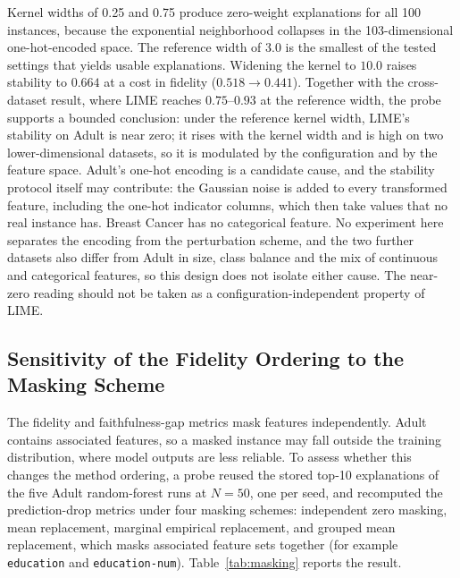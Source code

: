 \documentclass{cleiej}
\begin{document}
Kernel widths of 0.25 and 0.75 produce zero-weight explanations for all 100
instances, because the exponential neighborhood collapses in the
103-dimensional one-hot-encoded space. The reference width of 3.0 is the
smallest of the tested settings that yields usable explanations. Widening
the kernel to $10.0$ raises stability to $0.664$ at a cost in fidelity
($0.518 \rightarrow 0.441$). Together with the cross-dataset result, where
LIME reaches $0.75$--$0.93$ at the reference width, the probe supports a
bounded conclusion: under the reference kernel width, LIME's stability on
Adult is near zero; it rises with the kernel width and is high on two
lower-dimensional datasets, so it is modulated by the configuration and by
the feature space. Adult's one-hot encoding is a candidate cause, and the
stability protocol itself may contribute: the Gaussian noise is added to
every transformed feature, including the one-hot indicator columns, which
then take values that no real instance has. Breast Cancer has no
categorical feature. No experiment here separates the encoding from the
perturbation scheme, and the two further datasets also differ from Adult in
size, class balance and the mix of continuous and categorical features, so
this design does not isolate either cause. The near-zero reading should not be taken as a
configuration-independent property of LIME.

\subsection{Sensitivity of the Fidelity Ordering to the Masking Scheme}
\label{sec:masking}

The fidelity and faithfulness-gap metrics mask features independently.
Adult contains associated features, so a masked instance may fall outside
the training distribution, where model outputs are less reliable. To assess
whether this changes the method ordering, a probe reused the stored top-10
explanations of the five Adult random-forest runs at $N=50$, one per seed,
and recomputed the prediction-drop metrics under four masking schemes:
independent zero masking, mean replacement, marginal empirical replacement,
and grouped mean replacement, which masks associated feature sets together
(for example \texttt{education} and \texttt{education-num}).
Table~\ref{tab:masking} reports the result.
\end{document}
